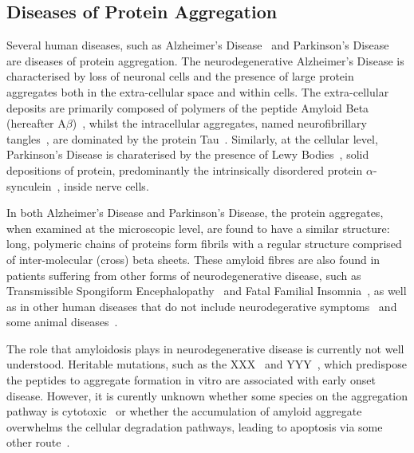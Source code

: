 \subsection{Diseases of Protein Aggregation}
Several human diseases, such as Alzheimer's Disease~\cite{???} and Parkinson's Disease~\cite{???} are diseases of protein aggregation. The neurodegenerative Alzheimer's Disease is characterised by loss of neuronal cells and the presence of large protein aggregates both in the extra-cellular space and within cells. The extra-cellular deposits are primarily composed of polymers of the peptide Amyloid Beta (hereafter A${\beta}$)~\cite{???}, whilst the intracellular aggregates, named neurofibrillary tangles~\cite{???}, are dominated by the protein Tau~\cite{???}. Similarly, at the cellular level, Parkinson's Disease is charaterised by the presence of Lewy Bodies~\cite{???}, solid depositions of protein, predominantly the intrinsically disordered protein $\alpha$-synculein~\cite{???}, inside nerve cells.


In both Alzheimer's Disease and Parkinson's Disease, the protein aggregates, when examined at the microscopic level, are found to have a similar structure: long, polymeric chains of proteins form fibrils with a regular structure comprised of inter-molecular (cross) beta sheets. These amyloid fibres are also found in patients suffering from other forms of neurodegenerative disease, such as Transmissible Spongiform Encephalopathy~\cite{???} and Fatal Familial Insomnia~\cite{???}, as well as in other human diseases that do not include neurodegerative symptoms~\cite{??? diabetes, ra} and some animal diseases~\cite{???scrapie}. 


The role that amyloidosis plays in neurodegenerative disease is currently not well understood. Heritable mutations, such as the XXX~\cite{???} and YYY~\cite{???}, which predispose the peptides to aggregate formation in vitro are associated with early onset disease. However, it is curently unknown whether some species on the aggregation pathway is cytotoxic~\cite{???} or whether the accumulation of amyloid aggregate overwhelms the cellular degradation pathways, leading to apoptosis via some other route~\cite{???}.      

